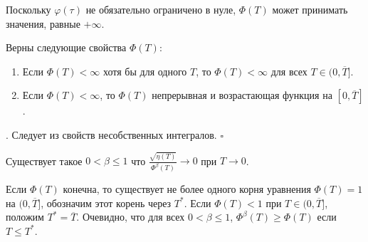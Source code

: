 \documentclass[../main.tex]{subfiles}
\begin{document}
Поскольку $\varphi(\tau)$ не обязательно ограничено в нуле, $\Phi(T)$ может принимать значения, равные $+\infty$.
\begin{lemma}%
Верны следующие свойства $\Phi(T)$:
\begin{enumerate}
 \item Если $\Phi(T) < \infty $ хотя бы для одного $T$, то $\Phi(T) < \infty $ для всех $T \in (0, \overline{T}]$.
\item Если $\Phi(T) < \infty $, то $\Phi(T)$ непрерывная и возрастающая функция на $ [0,\overline{T}]$.
 \end{enumerate}
\end{lemma}
\doc. 
Следует из свойств несобственных интегралов. \hfill $ \square $
\begin{assumption}\label{s22:asm2}
Существует такое $ 0 < \beta \leqslant 1$ что $\frac{\sqrt{\eta(T)}}{\Phi^\beta(T)} \to 0$ при $T \to 0$.
\end{assumption}
Если $\Phi(T)$ конечна, то существует не более одного корня уравнения $\Phi(T)=1$ на $(0,\overline{T}]$, обозначим этот корень через $T^*$. 
Если $\Phi(T)<1$ при $T\in (0,\overline{T}]$, положим $T^*=\overline{T}$. 
Очевидно, что для всех $ 0 < \beta \leqslant 1$, $\Phi^\beta(T)\geqslant \Phi(T)$ если $T \leqslant T^*$.
\end{document}
